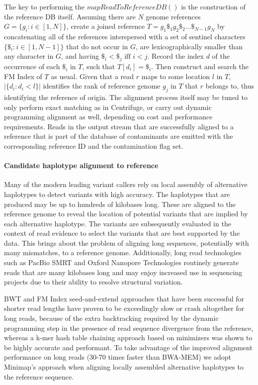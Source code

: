 The key to performing the $mapReadToReferenceDB()$ is the construction of the reference DB itself. Assuming there are $N$ genome references $G = \{g_i: i\in[1,N]\}$, create a joined reference $T = g_1\$_1g_2\$_2...\$_{N-1}g_N$ by concatenating all of the references interspersed with a set of sentinel characters $\{\$_i : i \in [1,N-1]\}$ that do not occur in $G$, are lexicographically smaller than any character in $G$, and having $\$_i < \$_j \text{ iff } i < j$. Record the index $d$ of the occurrence of each $\$_i$ in $T$, such that $T[d_i] = \$_i$. Then construct and search the FM Index of $T$ as usual. Given that a read $r$ maps to some location $l$ in $T$, $|\{d_i : d_i < l\}|$ identifies the rank of reference genome $g_j$ in $T$ that $r$ belongs to, thus identifying the reference of origin. The alignment process itself may be tuned to only perform exact matching as in Centrifuge, or carry out dynamic programming alignment as well, depending on cost and performance requirements. Reads in the output stream that are successfully aligned to a reference that is part of the database of contaminants are emitted with the corresponding reference ID and the contamination flag set.

\paragraph{Candidate haplotype alignment to reference}
Many of the modern leading variant callers\autocites{depristo2011framework}{garrison2012haplotype}{rimmer2014integrating} rely on local assembly of alternative haplotypes to detect variants with high accuracy. The haplotypes that are produced may be up to hundreds of kilobases long. These are aligned to the reference genome to reveal the location of potential variants that are implied by each alternative haplotype. The variants are subsequently evaluated in the context of read evidence to select the variants that are best supported by the data. This brings about the problem of aligning long sequences, potentially with many mismatches, to a reference genome. Additionally, long read technologies such as PacBio SMRT\autocite{rhoads2015pacbio} and Oxford Nanopore Technologies\autocite{lu2016oxford} routinely generate reads that are many kilobases long and may enjoy increased use in sequencing projects due to their ability to resolve structural variation.

BWT and FM Index seed-and-extend approaches\autocites{langmead2012fast}{li2013aligning} that have been successful for shorter read lengths have proven to be exceedingly slow or crash altogether for long reads, because of the extra backtracking required by the dynamic programming step in the presence of read sequence divergence from the reference, whereas a k-mer hash table chaining approach based on minimizers\autocite{roberts2004reducing} was shown to be highly accurate and performant\autocite{li2018minimap2}. To take advantage of the improved alignment performance on long reads (30-70 times faster than BWA-MEM) we adopt Minimap's approach when aligning locally assembled alternative haplotypes to the reference sequence.

